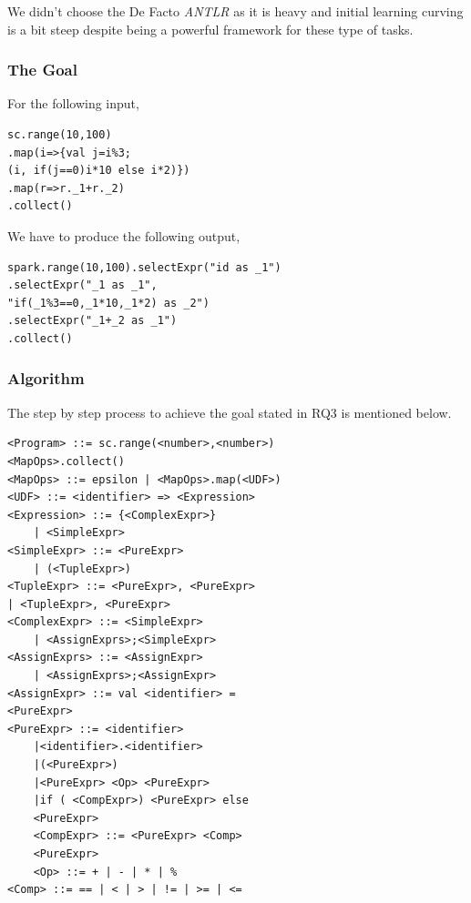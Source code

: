 \documentclass[sigplan]{acmart}\settopmatter{printfolios=true,printccs=false,printacmref=false}
\begin{document}
We didn't choose the De Facto \textit{ANTLR} as it is heavy and initial learning curving is a bit steep despite being a powerful framework for these type of tasks. 

\subsubsection{The Goal}
For the following input, 
\begin{lstlisting}
sc.range(10,100)
.map(i=>{val j=i%3;
(i, if(j==0)i*10 else i*2)})
.map(r=>r._1+r._2)
.collect()
\end{lstlisting}
We have to produce the following output,
\begin{lstlisting}
spark.range(10,100).selectExpr("id as _1")
.selectExpr("_1 as _1", 
"if(_1%3==0,_1*10,_1*2) as _2")
.selectExpr("_1+_2 as _1")
.collect()
\end{lstlisting}

\subsubsection{Algorithm}
The step by step process to achieve the goal stated in RQ3 is mentioned below.

\begin{lstlisting}[caption=UDF Grammar, label=list:g1]
<Program> ::= sc.range(<number>,<number>)
<MapOps>.collect()
<MapOps> ::= epsilon | <MapOps>.map(<UDF>)
<UDF> ::= <identifier> => <Expression>
<Expression> ::= {<ComplexExpr>} 
    | <SimpleExpr>
<SimpleExpr> ::= <PureExpr> 
    | (<TupleExpr>)
<TupleExpr> ::= <PureExpr>, <PureExpr> 
| <TupleExpr>, <PureExpr>
<ComplexExpr> ::= <SimpleExpr> 
    | <AssignExprs>;<SimpleExpr>
<AssignExprs> ::= <AssignExpr> 
    | <AssignExprs>;<AssignExpr>
<AssignExpr> ::= val <identifier> = 
<PureExpr>
<PureExpr> ::= <identifier> 
    |<identifier>.<identifier> 
    |(<PureExpr>) 
    |<PureExpr> <Op> <PureExpr> 
    |if ( <CompExpr>) <PureExpr> else 
    <PureExpr>
    <CompExpr> ::= <PureExpr> <Comp> 
    <PureExpr>
    <Op> ::= + | - | * | %
<Comp> ::= == | < | > | != | >= | <=
\end{lstlisting}
\end{document}
